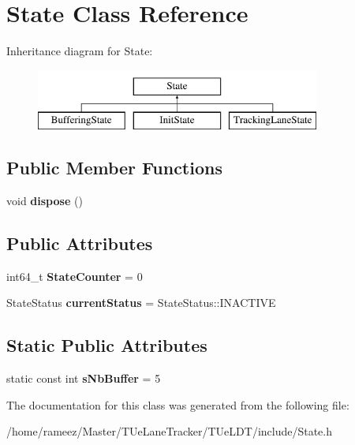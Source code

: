\hypertarget{classState}{\section{State Class Reference}
\label{classState}
}
Inheritance diagram for State\-:\begin{figure}[H]
\begin{center}
\leavevmode
\includegraphics[height=2.000000cm]{classState}
\end{center}
\end{figure}
\subsection*{Public Member Functions}
\begin{DoxyCompactItemize}
\item 
\hypertarget{classState_abb81d420f4112f07770c463ffcb89bbc}{void {\bfseries dispose} ()}\label{classState_abb81d420f4112f07770c463ffcb89bbc}

\end{DoxyCompactItemize}
\subsection*{Public Attributes}
\begin{DoxyCompactItemize}
\item 
\hypertarget{classState_acc98ede8633918c2077fbc204b4b6bad}{int64\-\_\-t {\bfseries State\-Counter} = 0}\label{classState_acc98ede8633918c2077fbc204b4b6bad}

\item 
\hypertarget{classState_a62a87cbab86fe461f6a66c98a98abac0}{State\-Status {\bfseries current\-Status} = State\-Status\-::\-I\-N\-A\-C\-T\-I\-V\-E}\label{classState_a62a87cbab86fe461f6a66c98a98abac0}

\end{DoxyCompactItemize}
\subsection*{Static Public Attributes}
\begin{DoxyCompactItemize}
\item 
\hypertarget{classState_a753c5c7247802fe071e3d8d73e5733f7}{static const int {\bfseries s\-Nb\-Buffer} = 5}\label{classState_a753c5c7247802fe071e3d8d73e5733f7}

\end{DoxyCompactItemize}


The documentation for this class was generated from the following file\-:\begin{DoxyCompactItemize}
\item 
/home/rameez/\-Master/\-T\-Ue\-Lane\-Tracker/\-T\-Ue\-L\-D\-T/include/State.\-h\end{DoxyCompactItemize}
